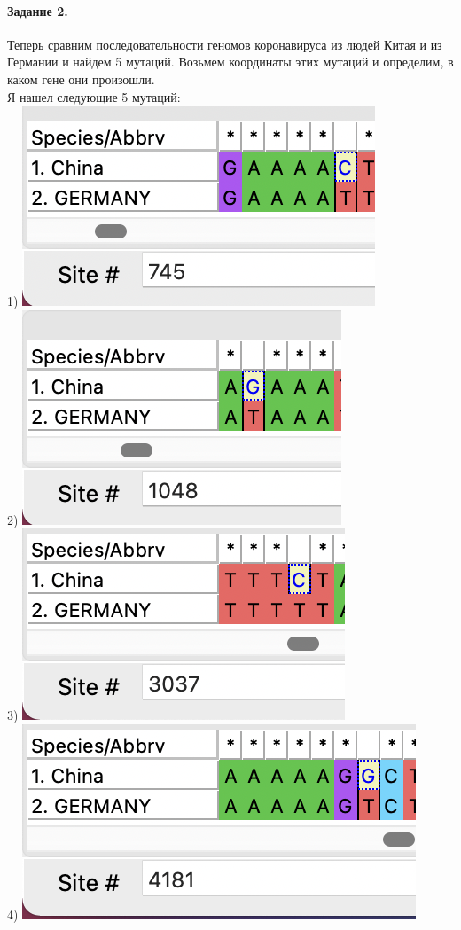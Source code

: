 \documentclass[12pt]{article}
\begin{document}
\paragraph{Задание 2.} Теперь сравним последовательности геномов коронавируса из людей Китая и из Германии и найдем 5 мутаций. Возьмем координаты этих мутаций и определим, в каком гене они произошли.\\
Я нашел следующие 5 мутаций:\\
1) \includegraphics[scale=0.8]{images/Mismatch1.png}\\
2) \includegraphics[scale=0.8]{images/Mismatch2.png}\\
3) \includegraphics[scale=0.8]{images/Mismatch3.png}\\
4) \includegraphics[scale=0.8]{images/Mismatch4.png}\\
\end{document}
